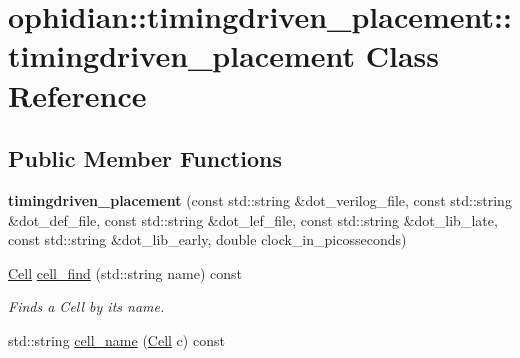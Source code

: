 \hypertarget{classophidian_1_1timingdriven__placement_1_1timingdriven__placement}{\section{ophidian\-:\-:timingdriven\-\_\-placement\-:\-:timingdriven\-\_\-placement Class Reference}
\label{classophidian_1_1timingdriven__placement_1_1timingdriven__placement}
}
\subsection*{Public Member Functions}
\begin{DoxyCompactItemize}
\item 
\hypertarget{classophidian_1_1timingdriven__placement_1_1timingdriven__placement_adc48b1b9f58578b40d76a6185065bd23}{{\bfseries timingdriven\-\_\-placement} (const std\-::string \&dot\-\_\-verilog\-\_\-file, const std\-::string \&dot\-\_\-def\-\_\-file, const std\-::string \&dot\-\_\-lef\-\_\-file, const std\-::string \&dot\-\_\-lib\-\_\-late, const std\-::string \&dot\-\_\-lib\-\_\-early, double clock\-\_\-in\-\_\-picosseconds)}\label{classophidian_1_1timingdriven__placement_1_1timingdriven__placement_adc48b1b9f58578b40d76a6185065bd23}

\item 
\hypertarget{classophidian_1_1timingdriven__placement_1_1timingdriven__placement_af1c4f2864c164e6d4fdcec3da391bce1}{\hyperlink{classophidian_1_1entity_1_1entity}{Cell} \hyperlink{classophidian_1_1timingdriven__placement_1_1timingdriven__placement_af1c4f2864c164e6d4fdcec3da391bce1}{cell\-\_\-find} (std\-::string name) const }\label{classophidian_1_1timingdriven__placement_1_1timingdriven__placement_af1c4f2864c164e6d4fdcec3da391bce1}

\begin{DoxyCompactList}\small\item\em Finds a Cell by its name. \end{DoxyCompactList}\item 
\hypertarget{classophidian_1_1timingdriven__placement_1_1timingdriven__placement_afd0781cae7f35b46803228bd8c037963}{std\-::string \hyperlink{classophidian_1_1timingdriven__placement_1_1timingdriven__placement_afd0781cae7f35b46803228bd8c037963}{cell\-\_\-name} (\hyperlink{classophidian_1_1entity_1_1entity}{Cell} c) const }\label{classophidian_1_1timingdriven__placement_1_1timingdriven__placement_afd0781cae7f35b46803228bd8c037963}


\end{DoxyCompactItemize}
